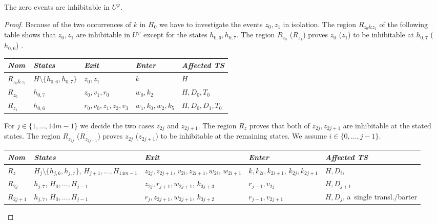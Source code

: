 \documentclass[english]{lipics_hacked}
\begin{document}
\begin{lemma}
\label{lemma:zero}
The zero events are inhibitable in $U^\varphi$.
\end{lemma}
%
\begin{proof}
Because of the two occurrences of $k$ in $H_0$ we have to investigate the events $z_0,z_1$ in isolation.
The region $R_{z_0\&z_1}$ of the following table shows that $z_0,z_1$ are inhibitable in $U^\varphi$ except for the states $h_{0,6},h_{0,7}$.
The region $R_{z_0}$ ($R_{z_1}$) proves $z_0$ ($z_1$) to be inhibitable at $h_{0,7}$ ($h_{0,6}$) .
\begin{longtable}{p{0.7cm} p{3cm}   p{2.5cm}    p{2.5cm}      p{2.7cm}  }
\textit{Nom} &\textit{States} & \textit{Exit} & \textit{Enter} & \textit{Affected TS}  \\ \hline
$R_{z_0\&z_1}$ & $H\setminus \{h_{0,6},h_{0,7}\}$& $z_0,z_1$ & $k$ & $H$ \\
 $R_{z_0}$& $h_{0,7}$& $z_0,v_1,r_0$ & $w_0,k_2$ & $H,D_0,T_0$ \\	
$R_{z_1}$ & $h_{0,6}$& $r_0,v_0,z_1,z_2,v_3$  & $w_1,k_0,w_2,k_5$ & $H,D_0,D_1,T_0$\\							
\end{longtable}

For $j\in \{1,\ldots,14m-1\}$ we decide the two cases $z_{2j}$ and $z_{2j+1}$.
The region $R_z$ proves that both of $z_{2j},z_{2j+1}$ are inhibitable at the stated states.
The region $R_{z_{2j}}$ ($R_{z_{2j+1}}$) proves $z_{2j}$ ($z_{2j+1}$) to be inhibitable at the remaining states.
We assume $ i\in \{0,\dots,j-1\}$.
\centering
\begin{longtable}{p{0.9cm} p{3cm}   p{2.5cm}    p{2.5cm}      p{2.7cm}  }
\textit{Nom} &\textit{States} & \textit{Exit} & \textit{Enter} & \textit{Affected TS}  \\ \hline
$R_z$ & $H_j \setminus \{h_{j,6},h_{j,7}\}$, $H_{j+1},\dots, H_{14m-1}$ & $z_{2j},z_{2j+1}$, $v_{2i},z_{2i+1},w_{2i}$, $w_{2i+1}$ & $k,k_{2i},k_{2i+1}$, $k_{2j},k_{2j+1}$  & $H,D_i$,  \\
$R_{2j}$ & $h_{j,7}$, $H_0,\dots,H_{j-1}$& $z_{2j},r_{j+1},w_{2j+1}$, $k_{3j+3}$ & $r_{j-1},v_{2j}$ & $H,D_{j+1}$ \\
$R_{2j+1}$ & $h_{j,7}$, $H_0,\dots,H_{j-1}$  & $r_j,z_{2j+1},w_{2j+1}$, $k_{3j+2}$ & $r_{j-1},v_{2j+1}$ & $H,D_j$, a~single transl./barter \\						
\end{longtable}
\end{proof}
\end{document}

